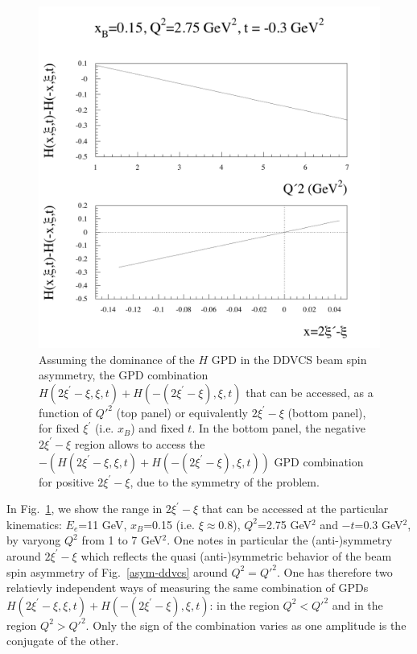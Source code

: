 \begin{figure}[htbp]
\begin{center} 
\includegraphics[width=1\textwidth]{scan_ddvcs.pdf}
\caption[]{Assuming the dominance of the $H$ GPD in the DDVCS beam spin asymmetry,
the GPD combination $H(2\xi^\prime-\xi,\xi,t)+H(-(2\xi^\prime-\xi),\xi,t)$
that can be accessed, as a function of $Q'^2$ (top panel)
or equivalently $2\xi^\prime-\xi$ (bottom panel), for fixed $\xi^\prime$ (i.e.
$x_B$) and fixed $t$. In the bottom panel, the negative $2\xi^\prime-\xi$
region allows to access the $-(H(2\xi^\prime-\xi,\xi,t)+H(-(2\xi^\prime-\xi),\xi,t))$
GPD combination for positive $2\xi^\prime-\xi$, due to the symmetry of the
problem.}
\label{scan-ddvcs}
\end{center}
\end{figure}

In Fig.~\ref{scan-ddvcs}, we show the range in $2\xi^\prime-\xi$
that can be accessed at the particular kinematics: $E_e$=11 GeV,
$x_B$=0.15 (i.e. $\xi\approx$0.8), $Q^2$=2.75 GeV$^2$ and $-t$=0.3 GeV$^2$,
by varyong $Q^2$ from 1 to 7 GeV$^2$. One notes in particular
the (anti-)symmetry around $2\xi^\prime-\xi$ which reflects the
quasi (anti-)symmetric behavior of the beam spin asymmetry of
Fig.~\ref{asym-ddvcs} around $Q^2=Q'^2$. One has therefore
two relatievly independent ways of measuring the same
combination of GPDs $H(2\xi^\prime-\xi,\xi,t)+H(-(2\xi^\prime-\xi),\xi,t)$:
in the region $Q^2<Q'^2$ and in the region $Q^2>Q'^2$. Only the sign
of the combination varies as one amplitude is the conjugate of the other.

